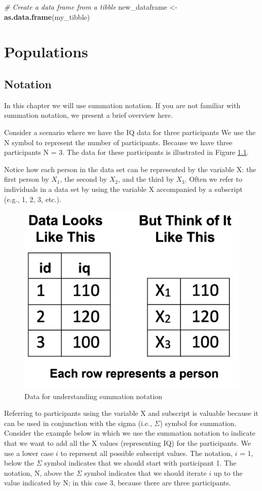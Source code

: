 \documentclass[
]{krantz}
\makeatletter
\newenvironment{Shaded}{\begin{snugshade}}{\end{snugshade}}
\newcommand{\CommentTok}[1]{\textcolor[rgb]{0.37,0.37,0.37}{\textit{#1}}}
\newcommand{\KeywordTok}[1]{\textcolor[rgb]{0.27,0.27,0.27}{\textbf{#1}}}
\newcommand{\NormalTok}[1]{#1}
\newcommand{\StringTok}[1]{\textcolor[rgb]{0.5,0.5,0.5}{#1}}
\newenvironment{kframe}{%
\medskip{}
\setlength{\fboxsep}{.8em}
 \def\at@end@of@kframe{}%
 \ifinner\ifhmode%
  \def\at@end@of@kframe{\end{minipage}}%
  \begin{minipage}{\columnwidth}%
 \fi\fi%
 \def\FrameCommand##1{\hskip\@totalleftmargin \hskip-\fboxsep
 \colorbox{shadecolor}{##1}\hskip-\fboxsep
     \hskip-\linewidth \hskip-\@totalleftmargin \hskip\columnwidth}%
 \MakeFramed {\advance\hsize-\width
   \@totalleftmargin\z@ \linewidth\hsize
   \@setminipage}}%
 {\par\unskip\endMakeFramed%
 \at@end@of@kframe}
\renewenvironment{Shaded}{\begin{kframe}}{\end{kframe}}
\makeatother
\begin{document}
\begin{Shaded}
\begin{Highlighting}[]
\CommentTok{# Create a data frame from a tibble}
\NormalTok{new_dataframe <-}\StringTok{ }\KeywordTok{as.data.frame}\NormalTok{(my_tibble)}
\end{Highlighting}
\end{Shaded}

\hypertarget{populations}{%
\chapter{Populations}\label{populations}}

\hypertarget{notation}{%
\section{Notation}\label{notation}}

In this chapter we will use summation notation. If you are not familiar with summation notation, we present a brief overview here.

Consider a scenario where we have the IQ data for three participants We use the N symbol to represent the number of participants. Because we have three participants N = 3. The data for these participants is illustrated in Figure \ref{fig:notationdata}.

Notice how each person in the data set can be represented by the variable X: the first person by \(X_1\), the second by \(X_2\), and the third by \(X_3\). Often we refer to individuals in a data set by using the variable X accompanied by a subscript (e.g., 1, 2, 3, etc.).

\begin{figure}
\includegraphics[width=0.4\linewidth]{ch_populations/images/screenshot_data_n6} \caption{Data for understanding summation notation}\label{fig:notationdata}
\end{figure}

Referring to participants using the variable X and subscript is valuable because it can be used in conjunction with the sigma (i.e., \(\Sigma\)) symbol for summation. Consider the example below in which we use the summation notation to indicate that we want to add all the X values (representing IQ) for the participants. We use a lower case \(i\) to represent all possible subscript values. The notation, \(i\) = 1, below the \(\Sigma\) symbol indicates that we should start with participant 1. The notation, N, above the \(\Sigma\) symbol indicates that we should iterate \(i\) up to the value indicated by N; in this case 3, because there are three participants.
\end{document}

